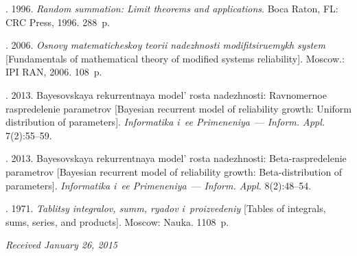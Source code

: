   \begin{multicols}{2}

\renewcommand{\bibname}{\protect\rmfamily References}


{\small\frenchspacing
 {%
 \begin{thebibliography}{9}

 \vspace*{-4pt}

.
1996. \textit{Random summation: Limit theorems and applications}.
Boca Raton, FL: CRC Press, 1996. 288~p.

. 2006.
\textit{Osnovy ma\-te\-ma\-ti\-che\-skoy teorii nadezhnosti modifitsiruemykh system}
[Fundamentals of mathematical theory of modified systems reliability].
Moscow.: IPI RAN, 2006. 108~p.

.
2013. Bayesovskaya rekurrentnaya model' rosta nadezhnosti:
Ravnomernoe raspredelenie parametrov [Bayesian recurrent model of reliability
growth: Uniform distribution of parameters].
\textit{Informatika i~ee Primeneniya}~--- \textit{Inform. Appl.} 7(2):55--59.

.
2013. Bayesovskaya rekurrentnaya model' rosta nadezhnosti:
Be\-ta-ras\-pre\-de\-le\-nie parametrov [Bayesian recurrent model
of reliability growth: Beta-distribution of parameters].
\textit{Informatika i~ee Primeneniya}~--- \textit{Inform. Appl.} 8(2):48--54.

. 1971. \textit{Tablitsy integralov,
summ, ryadov i~proizvedeniy} [Tables of integrals, sums, series, and products].
Moscow: Nauka. 1108~p.
\end{thebibliography}

 }
 }

\end{multicols}

\vspace*{-8pt}

\hfill{\small\textit{Received January 26, 2015}}

\vspace*{-24pt}


\Contr

